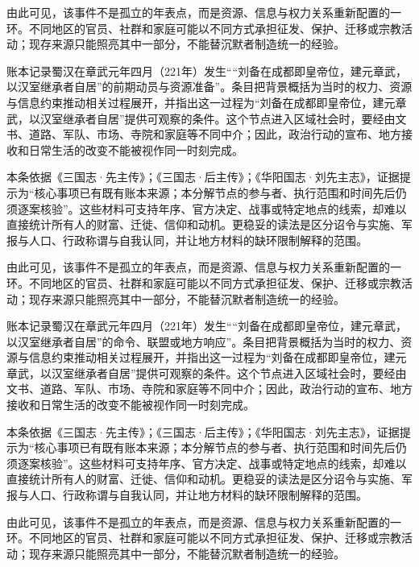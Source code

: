 由此可见，该事件不是孤立的年表点，而是资源、信息与权力关系重新配置的一环。不同地区的官员、社群和家庭可能以不同方式承担征发、保护、迁移或宗教活动；现存来源只能照亮其中一部分，不能替沉默者制造统一的经验。

账本记录蜀汉在章武元年四月（221年）发生““刘备在成都即皇帝位，建元章武，以汉室继承者自居”的前期动员与资源准备”。条目把背景概括为当时的权力、资源与信息约束推动相关过程展开，并指出这一过程为“刘备在成都即皇帝位，建元章武，以汉室继承者自居”提供可观察的条件。这个节点进入区域社会时，要经由文书、道路、军队、市场、寺院和家庭等不同中介；因此，政治行动的宣布、地方接收和日常生活的改变不能被视作同一时刻完成。

本条依据《三国志·先主传》；《三国志·后主传》；《华阳国志·刘先主志》，证据提示为“核心事项已有既有账本来源；本分解节点的参与者、执行范围和时间先后仍须逐案核验”。这些材料可支持年序、官方决定、战事或特定地点的线索，却难以直接统计所有人的财富、迁徙、信仰和动机。更稳妥的读法是区分诏令与实施、军报与人口、行政称谓与自我认同，并让地方材料的缺环限制解释的范围。

由此可见，该事件不是孤立的年表点，而是资源、信息与权力关系重新配置的一环。不同地区的官员、社群和家庭可能以不同方式承担征发、保护、迁移或宗教活动；现存来源只能照亮其中一部分，不能替沉默者制造统一的经验。

账本记录蜀汉在章武元年四月（221年）发生““刘备在成都即皇帝位，建元章武，以汉室继承者自居”的命令、联盟或地方响应”。条目把背景概括为当时的权力、资源与信息约束推动相关过程展开，并指出这一过程为“刘备在成都即皇帝位，建元章武，以汉室继承者自居”提供可观察的条件。这个节点进入区域社会时，要经由文书、道路、军队、市场、寺院和家庭等不同中介；因此，政治行动的宣布、地方接收和日常生活的改变不能被视作同一时刻完成。

本条依据《三国志·先主传》；《三国志·后主传》；《华阳国志·刘先主志》，证据提示为“核心事项已有既有账本来源；本分解节点的参与者、执行范围和时间先后仍须逐案核验”。这些材料可支持年序、官方决定、战事或特定地点的线索，却难以直接统计所有人的财富、迁徙、信仰和动机。更稳妥的读法是区分诏令与实施、军报与人口、行政称谓与自我认同，并让地方材料的缺环限制解释的范围。

由此可见，该事件不是孤立的年表点，而是资源、信息与权力关系重新配置的一环。不同地区的官员、社群和家庭可能以不同方式承担征发、保护、迁移或宗教活动；现存来源只能照亮其中一部分，不能替沉默者制造统一的经验。


